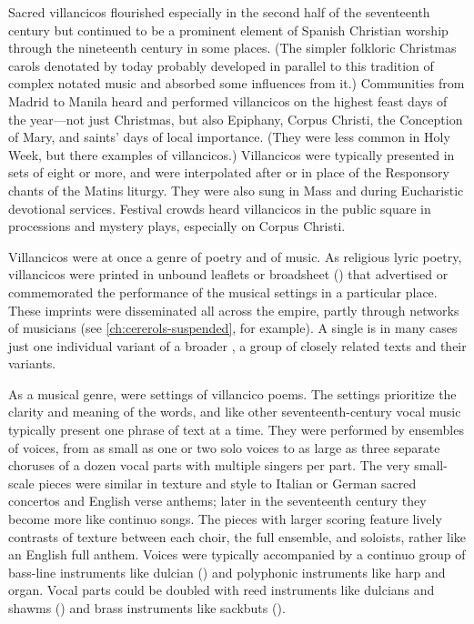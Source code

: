 Sacred villancicos flourished especially in the second half of the seventeenth
century but continued to be a prominent element of Spanish Christian worship
through the nineteenth century in some places.
(The simpler folkloric Christmas carols denotated by  today
probably developed in parallel to this tradition of complex notated music and
absorbed some influences from it.)
Communities from Madrid to Manila heard and performed villancicos on the
highest feast days of the year---not just Christmas, but also Epiphany, Corpus
Christi, the Conception of Mary, and saints' days of local importance.
(They were less common in Holy Week, but there examples of 
villancicos.)
Villancicos were typically presented in sets of eight or more, and were
interpolated after or in place of the Responsory chants of the Matins liturgy.
They were also sung in Mass and during Eucharistic devotional services.
Festival crowds heard villancicos in the public square in processions and
mystery plays, especially on Corpus Christi.

Villancicos were at once a genre of poetry and of music.
As religious lyric poetry, villancicos were printed in unbound leaflets or
broadsheet () that advertised or commemorated the
performance of the musical settings in a particular place.%
These imprints were disseminated all across the empire, partly through networks
of musicians (see \cref{ch:cererols-suspended}, for example).
A single  is in many cases just one individual variant of
a broader , a group of closely related texts and their
variants.

As a musical genre,  were settings of villancico poems.
The settings prioritize the clarity and meaning of the words, and like other
seventeenth-century vocal music typically present one phrase of text at a time.
They were performed by ensembles of voices, from as small as one or two solo
voices to as large as three separate choruses of a dozen vocal parts with
multiple singers per part.
The very small-scale pieces were similar in texture and style to Italian or
German sacred concertos and English verse anthems; later in the seventeenth
century they become more like continuo songs.
The pieces with larger scoring feature lively contrasts of texture between each
choir, the full ensemble, and soloists, rather like an English full anthem.
Voices were typically accompanied by a continuo group of bass-line instruments
like dulcian () and polyphonic instruments like harp and organ.
Vocal parts could be doubled with reed instruments like dulcians and shawms
() and brass instruments like sackbuts ().

